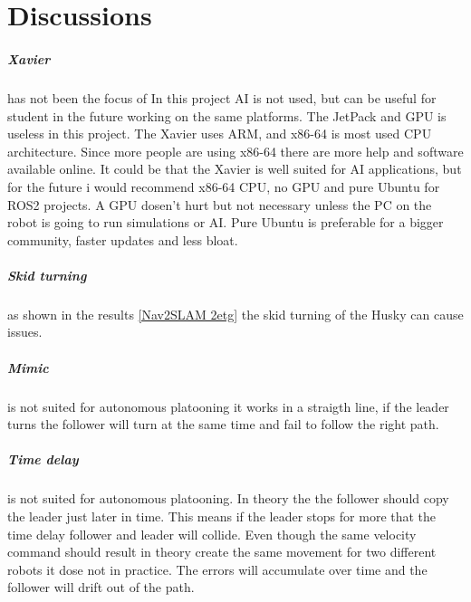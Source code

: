 \chapter{Discussions}

\paragraph{Xavier} has not been the focus of
In this project AI is not used, but can be useful for student in the future working on the same platforms. The JetPack and GPU is useless in this project. The Xavier uses ARM, and x86-64 is most used CPU architecture. Since more people are using x86-64 there are more help and software available online. 
It could be that the Xavier is well suited for AI applications, but for the future i would recommend x86-64 CPU, no GPU and pure Ubuntu for ROS2 projects. A GPU dosen't hurt but not necessary unless the PC on the robot is going to run simulations or AI. Pure Ubuntu is preferable for a bigger community, faster updates and less bloat. 

\paragraph{Skid turning} as shown in the results \ref{Nav2SLAM 2etg} the skid turning of the Husky can cause issues.  

\paragraph{Mimic} is not suited for autonomous platooning it works in a straigth line, if the leader turns the follower will turn at the same time and fail to follow the right path. 

\paragraph{Time delay} is not suited for autonomous platooning. In theory the the follower should copy the leader just later in time. This means if the leader stops for more that the time delay follower and leader will collide. Even though the same velocity command should result in theory create the same movement for two different robots it dose not in practice. The errors will accumulate over time and the follower will drift out of the path. 

